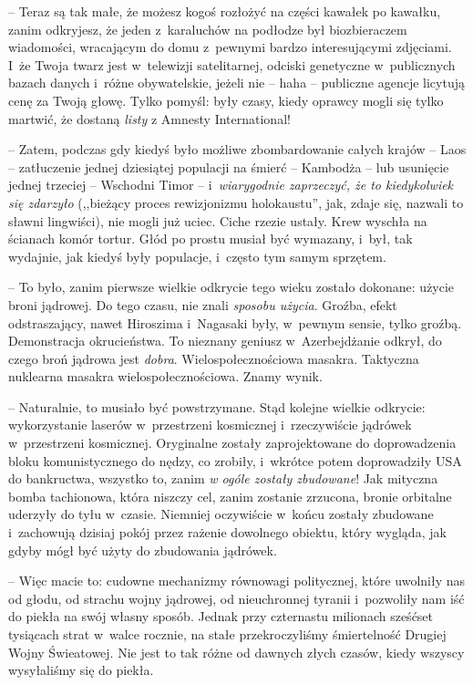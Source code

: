 \documentclass[oneside,polish,11pt,sfheadings]{mwbk}
\begin{document}
-- Teraz są tak małe, że możesz kogoś rozłożyć na części kawałek po
kawałku, zanim odkryjesz, że jeden z~karaluchów na podłodze był
biozbieraczem wiadomości, wracającym do domu z~pewnymi bardzo
interesującymi zdjęciami. I~że Twoja twarz jest w~telewizji
satelitarnej, odciski genetyczne w~publicznych bazach danych i~różne
obywatelskie, jeżeli nie -- haha -- publiczne agencje licytują cenę za
Twoją głowę. Tylko pomyśl: były czasy, kiedy oprawcy mogli się tylko
martwić, że dostaną \emph{listy }z Amnesty International!

-- Zatem, podczas gdy kiedyś było możliwe zbombardowanie całych krajów -- Laos -- zatłuczenie jednej dziesiątej populacji na śmierć -- Kambodża -- lub usunięcie jednej trzeciej -- Wschodni Timor -- i~\emph{wiarygodnie
zaprzeczyć, że to kiedykolwiek się zdarzyło} (,,bieżący proces
rewizjonizmu holokaustu'', jak, zdaje się, nazwali to sławni lingwiści),
nie mogli już uciec. Ciche rzezie ustały. Krew wyschła na ścianach komór
tortur. Głód po prostu musiał być wymazany, i~był, tak wydajnie, jak
kiedyś były populacje, i~często tym samym sprzętem.

-- To było, zanim pierwsze wielkie odkrycie tego wieku zostało dokonane:
użycie broni jądrowej. Do tego czasu, nie znali \emph{sposobu użycia}.
Groźba, efekt odstraszający, nawet Hiroszima i~Nagasaki były, w~pewnym
sensie, tylko groźbą. Demonstracja okrucieństwa. To nieznany geniusz w~Azerbejdżanie odkrył, do czego broń jądrowa jest \emph{dobra}.
Wielospołecznościowa masakra. Taktyczna nuklearna masakra
wielospołecznościowa. Znamy wynik.

-- Naturalnie, to musiało być powstrzymane. Stąd kolejne wielkie
odkrycie: wykorzystanie laserów w~przestrzeni kosmicznej i~rzeczywiście
jądrówek w~przestrzeni kosmicznej. Oryginalne zostały zaprojektowane do
doprowadzenia bloku komunistycznego do nędzy, co zrobiły, i~wkrótce
potem doprowadziły USA do bankructwa, wszystko to, zanim \emph{w ogóle
zostały zbudowane}! Jak mityczna bomba tachionowa, która niszczy cel,
zanim zostanie zrzucona, bronie orbitalne uderzyły do tyłu w~czasie.
Niemniej oczywiście w~końcu zostały zbudowane i~zachowują dzisiaj pokój
przez rażenie dowolnego obiektu, który wygląda, jak gdyby mógł być użyty
do zbudowania jądrówek.

-- Więc macie to: cudowne mechanizmy równowagi politycznej, które
uwolniły nas od głodu, od strachu wojny jądrowej, od nieuchronnej
tyranii i~pozwoliły nam iść do piekła na swój własny sposób. Jednak przy
czternastu milionach sześćset tysiącach strat w~walce rocznie, na stałe
przekroczyliśmy śmiertelność Drugiej Wojny Świeatowej. Nie jest to tak
różne od dawnych złych czasów, kiedy wszyscy wysyłaliśmy się do piekła.
\end{document}
